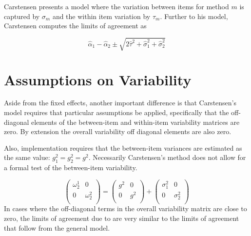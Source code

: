 \documentclass[12pt, a4paper]{report}
\theoremstyle{plain}
\theoremstyle{definition}
\theoremstyle{remark}
\begin{document}
Carstensen presents a model where the variation between items for method $m$ is captured by $\sigma_m$ and the within item variation by $\tau_m$. Further to his model, Carstensen computes the limits of agreement
as

\[
\hat{\alpha}_1 - \hat{\alpha}_2 \pm \sqrt{2 \hat{\tau}^2 +
	\hat{\sigma}^2_1 + \hat{\sigma}^2_2}
\]





















	
\section{Assumptions on Variability}
	
	Aside from the fixed effects, another important difference is that Carstensen's model requires that particular assumptions be applied, specifically that the off-diagonal elements of the between-item
	and within-item variability matrices are zero. By extension the
	overall variability off diagonal elements are also zero.




	Also, implementation requires that the between-item variances are
	estimated as the same value: $g^2_1 = g^2_2 = g^2$. Necessarily
	Carstensen's method does not allow for a formal test of the
	between-item variability.
	
	\[\left(\begin{array}{cc}
	\omega^1_2  & 0 \\
	0 & \omega^2_2 \\
	\end{array}  \right)
	=  \left(
	\begin{array}{cc}
	g^2  & 0 \\
	0 & g^2 \\
	\end{array} \right)+
	\left(
	\begin{array}{cc}
	\sigma^2_1  & 0 \\
	0 & \sigma^2_2 \\
	\end{array}\right)
	\]
In cases where the off-diagonal terms in the overall variability
matrix are close to zero, the limits of agreement due to \citet{BXC2008} are very similar to the limits of agreement that follow from the general model.
	
\end{document}
